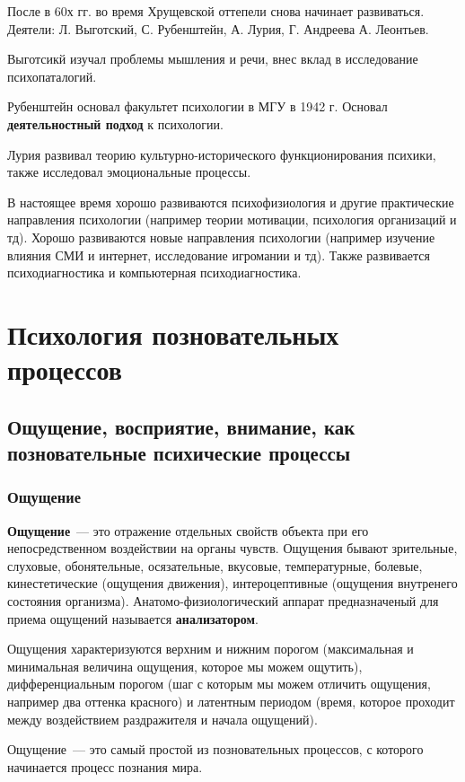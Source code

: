 После в 60х гг. во время Хрущевской оттепели снова начинает развиваться. Деятели: Л. Выготский, С. Рубенштейн, А. Лурия, Г. Андреева А. Леонтьев.

Выготсикй изучал проблемы мышления и речи, внес вклад в исследование психопаталогий.

Рубенштейн основал факультет психологии в МГУ в 1942 г. Основал \textbf{деятельностный подход} к психологии.

Лурия развивал теорию культурно-исторического функционирования психики, также исследовал эмоциональные процессы.

В настоящее время хорошо развиваются психофизиология и другие практические направления психологии (например теории мотивации, психология организаций и тд). Хорошо развиваются новые направления психологии (например изучение влияния СМИ и интернет, исследование игромании и тд). Также развивается психодиагностика и компьютерная психодиагностика.

\section{Психология позновательных процессов}
\subsection{Ощущение, восприятие, внимание, как позновательные психические процессы}
\subsubsection{Ощущение}
\textbf{Ощущение}~--- это отражение отдельных свойств объекта при его непосредственном воздействии на органы чувств. Ощущения бывают зрительные, слуховые, обонятельные, осязательные, вкусовые, температурные, болевые, кинестетические (ощущения движения), интероцептивные (ощущения внутренего состояния организма). Анатомо-физиологический аппарат предназначеный для приема ощущений называется \textbf{анализатором}.

Ощущения характеризуются верхним и нижним порогом (максимальная и минимальная величина ощущения, которое мы можем ощутить), дифференциальным порогом (шаг с которым мы можем отличить ощущения, например два оттенка красного) и латентным периодом (время, которое проходит между воздействием раздражителя и начала ощущений).

Ощущение~--- это самый простой из позновательных процессов, с которого начинается процесс познания мира.

